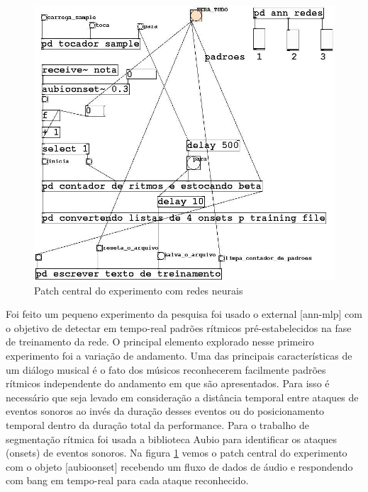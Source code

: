 \documentclass[draft]{ppgmus}
\begin{document}
\begin{figure}
\includegraphics[scale=.5]{fann1}
\caption{Patch central do experimento com redes neurais}
\label{fann1}
\end{figure} 
 
Foi feito um pequeno experimento da pesquisa  foi usado o external [ann-mlp] com o objetivo de detectar  em tempo-real padrões 
rítmicos pré-estabelecidos na fase de treinamento da rede.
    O principal elemento explorado  nesse primeiro experimento foi a variação de andamento. Uma das principais 
características de um diálogo musical é o fato dos músicos reconhecerem facilmente padrões rítmicos independente do 
andamento em que são apresentados. Para isso é necessário que seja levado em consideração a distância temporal entre 
ataques de eventos sonoros ao invés da duração desses eventos ou do posicionamento temporal dentro da duração total da 
performance. Para o trabalho de segmentação rítmica foi usada a biblioteca Aubio para identificar os ataques (onsets) de eventos 
sonoros. Na figura \ref{fann1} vemos o patch central do experimento com o objeto  [aubioonset\texttildelow] recebendo um fluxo de 
dados de áudio e respondendo com bang em tempo-real para cada ataque reconhecido.
\end{document}
